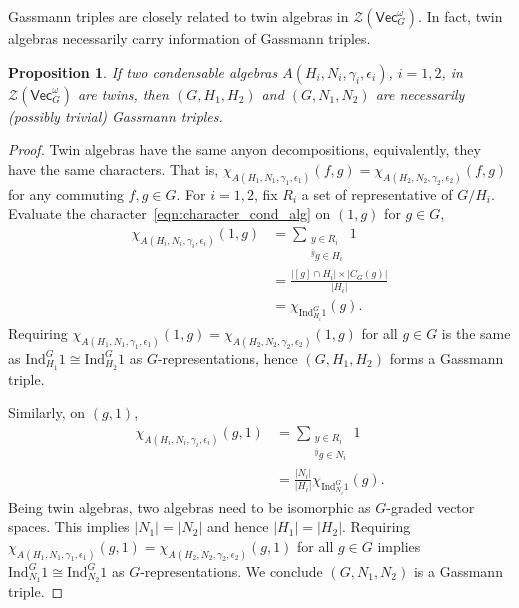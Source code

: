 \documentclass[aps,twocolumn,prx,floatfix,preprintnumbers, nofootinbib,10pt]{revtex4-2}
\numberwithin{equation}{section}
\newtheorem{proposition}[theorem]{Proposition}
\theoremstyle{definition}
\newcommand{\nn}{\nonumber}
\newcommand{\Ind}{\text{Ind}}
\newcommand{\cZ}{\mathcal{Z}}
\renewcommand{\Vec}{\mathsf{Vec}}
\begin{document}
{Gassmann triples are closely related to twin algebras in $\cZ(\Vec_G^\omega)$. In fact, twin algebras necessarily carry information of Gassmann triples.
\begin{proposition}
\label{prop:HNGassmann}
    If two condensable algebras $A(H_i,N_i,\gamma_i,\epsilon_i)$, $i=1,2$, in $\cZ(\Vec_G^\omega)$ are twins, then $(G, H_1, H_2)$ and $(G, N_1, N_2)$ are necessarily (possibly trivial) Gassmann triples.
\end{proposition}
\begin{proof}
    Twin algebras have the same anyon decompositions, equivalently, they have the same characters. That is, $\chi_{A(H_1,N_1,\gamma_1,\epsilon_1)}(f,g)=\chi_{A(H_2,N_2,\gamma_2,\epsilon_2)}(f,g)$ for any commuting $f,g\in G$. 
    For $i=1,2$, fix $R_i$ a set of representative of $G/H_i$.
    Evaluate the character~\eqref{eqn:character_cond_alg} on $(1,g)$ for $g\in G$,
    \begin{equation}
        \begin{split}
            \chi_{A(H_i, N_i, \gamma_i, \epsilon_i)}(1, g) & = \sum_{\substack{y\in R_i\\ {}^{\bar{y}}g\in H_i}} 1 \\
            & = \frac{|[g]\cap H_i|\times |C_G(g)|}{|H_i|} \nn\\
            & = \chi_{\text{Ind}^G_{H_i}1}(g).
        \end{split}
    \end{equation}
    Requiring $\chi_{A(H_1, N_1, \gamma_1, \epsilon_1)}(1, g)=\chi_{A(H_2, N_2, \gamma_2, \epsilon_2)}(1, g)$ for all $g\in G$ is the same as $\Ind^G_{H_1}1\cong \Ind^G_{H_2}1$ as $G$-representations, hence $(G, H_1, H_2)$ forms a Gassmann triple.

    Similarly, on $(g,1)$, 
    \begin{equation}
        \begin{split}
            \chi_{A(H_i, N_i, \gamma_i, \epsilon_i)}(g, 1) & = \sum_{\substack{y\in R_i\\ {}^{\bar{y}}g\in N_i}} 1 \\
            & = \frac{|N_i|}{|H_i|} \chi_{\text{Ind}^G_{N_i}1}(g).
        \end{split}
    \end{equation}
    Being twin algebras, two algebras need to be isomorphic as $G$-graded vector spaces. This implies $|N_1|=|N_2|$ and hence $|H_1|=|H_2|$. Requiring $\chi_{A(H_1, N_1, \gamma_1, \epsilon_1)}(g, 1)=\chi_{A(H_2, N_2, \gamma_2, \epsilon_2)}(g, 1)$ for all $g\in G$ implies $\Ind^G_{N_1}1\cong \Ind^G_{N_2}1$ as $G$-representations. We conclude $(G, N_1, N_2)$ is a Gassmann triple.
\end{proof}
}
\end{document}

